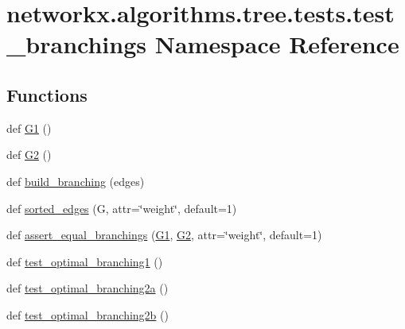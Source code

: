 \hypertarget{namespacenetworkx_1_1algorithms_1_1tree_1_1tests_1_1test__branchings}{}\section{networkx.\+algorithms.\+tree.\+tests.\+test\+\_\+branchings Namespace Reference}
\label{namespacenetworkx_1_1algorithms_1_1tree_1_1tests_1_1test__branchings}
\subsection*{Functions}
\begin{DoxyCompactItemize}
\item 
def \hyperlink{namespacenetworkx_1_1algorithms_1_1tree_1_1tests_1_1test__branchings_a4e855e1502b7b2832559ecd0d0d01ae4}{G1} ()
\item 
def \hyperlink{namespacenetworkx_1_1algorithms_1_1tree_1_1tests_1_1test__branchings_abd1df1eadee52f3d5854aa88358ac0af}{G2} ()
\item 
def \hyperlink{namespacenetworkx_1_1algorithms_1_1tree_1_1tests_1_1test__branchings_a625c8e2891594eaf2d2cd688f404eaca}{build\+\_\+branching} (edges)
\item 
def \hyperlink{namespacenetworkx_1_1algorithms_1_1tree_1_1tests_1_1test__branchings_a5aa7264d7977040cdf7d6b5e49c4e9b8}{sorted\+\_\+edges} (G, attr=\char`\"{}weight\char`\"{}, default=1)
\item 
def \hyperlink{namespacenetworkx_1_1algorithms_1_1tree_1_1tests_1_1test__branchings_a5a118ea8fbc3d56205acebbbacbbb479}{assert\+\_\+equal\+\_\+branchings} (\hyperlink{namespacenetworkx_1_1algorithms_1_1tree_1_1tests_1_1test__branchings_a4e855e1502b7b2832559ecd0d0d01ae4}{G1}, \hyperlink{namespacenetworkx_1_1algorithms_1_1tree_1_1tests_1_1test__branchings_abd1df1eadee52f3d5854aa88358ac0af}{G2}, attr=\char`\"{}weight\char`\"{}, default=1)
\item 
def \hyperlink{namespacenetworkx_1_1algorithms_1_1tree_1_1tests_1_1test__branchings_a587da8058c5fb9ad0806d5c300e65cbd}{test\+\_\+optimal\+\_\+branching1} ()
\item 
def \hyperlink{namespacenetworkx_1_1algorithms_1_1tree_1_1tests_1_1test__branchings_aec6dd1d6a83525d320f32c31e4ee82b9}{test\+\_\+optimal\+\_\+branching2a} ()
\item 
def \hyperlink{namespacenetworkx_1_1algorithms_1_1tree_1_1tests_1_1test__branchings_a41d12f5e9f010ef62fb67b02e3ea8c30}{test\+\_\+optimal\+\_\+branching2b} ()

\end{DoxyCompactItemize}
